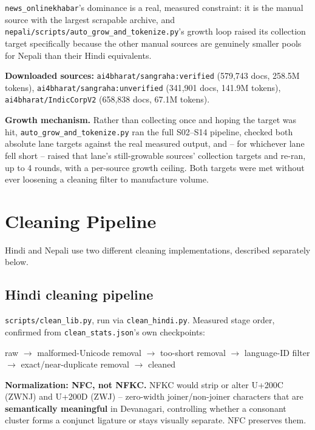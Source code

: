 \documentclass[11pt]{article}
\begin{document}
\texttt{news\_onlinekhabar}'s dominance is a real, measured constraint:
it is the manual source with the largest scrapable archive, and
\texttt{nepali/scripts/auto\_grow\_and\_tokenize.py}'s growth loop raised
its collection target specifically because the other manual sources are
genuinely smaller pools for Nepali than their Hindi equivalents.

\textbf{Downloaded sources:} \texttt{ai4bharat/sangraha:verified}
(579{,}743 docs, 258.5M tokens), \texttt{ai4bharat/sangraha:unverified}
(341{,}901 docs, 141.9M tokens), \texttt{ai4bharat/IndicCorpV2}
(658{,}838 docs, 67.1M tokens).

\textbf{Growth mechanism.} Rather than collecting once and hoping the
target was hit, \texttt{auto\_grow\_and\_tokenize.py} ran the full
S02--S14 pipeline, checked both absolute lane targets against the real
measured output, and -- for whichever lane fell short -- raised that
lane's still-growable sources' collection targets and re-ran, up to 4
rounds, with a per-source growth ceiling. Both targets were met without
ever loosening a cleaning filter to manufacture volume.

\section{Cleaning Pipeline}
\label{sec:cleaning}

Hindi and Nepali use two different cleaning implementations, described
separately below.

\subsection{Hindi cleaning pipeline}

\texttt{scripts/clean\_lib.py}, run via \texttt{clean\_hindi.py}. Measured
stage order, confirmed from \texttt{clean\_stats.json}'s own checkpoints:

\begin{center}
raw $\to$ malformed-Unicode removal $\to$ too-short removal $\to$
language-ID filter $\to$ exact/near-duplicate removal $\to$ cleaned
\end{center}

\textbf{Normalization: NFC, not NFKC.} NFKC would strip or alter U+200C
(ZWNJ) and U+200D (ZWJ) -- zero-width joiner/non-joiner characters that
are \textbf{semantically meaningful} in Devanagari, controlling whether a
consonant cluster forms a conjunct ligature or stays visually separate.
NFC preserves them.
\end{document}
